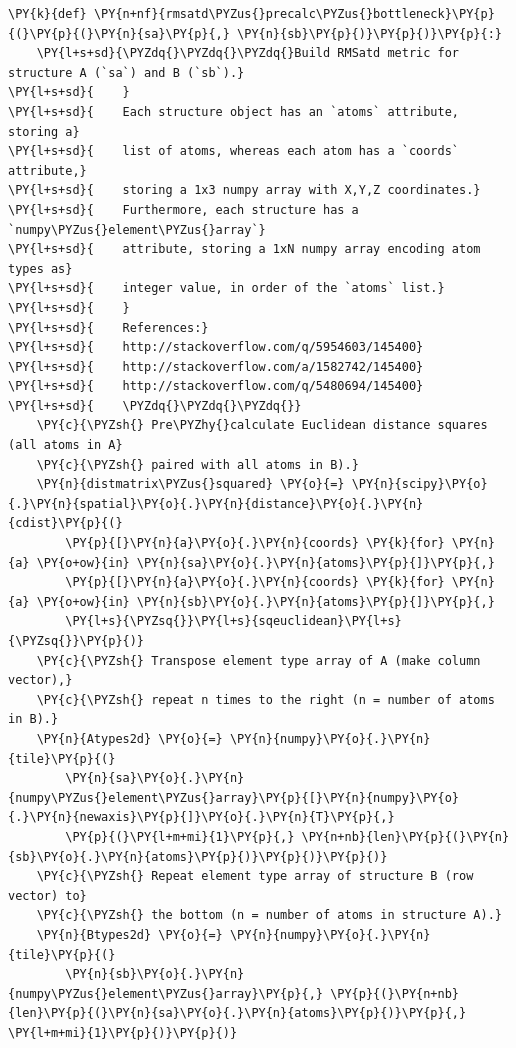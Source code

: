 \begin{listing}
\begin{Verbatim}[fontsize=\tiny,commandchars=\\\{\}]
\PY{k}{def} \PY{n+nf}{rmsatd\PYZus{}precalc\PYZus{}bottleneck}\PY{p}{(}\PY{p}{(}\PY{n}{sa}\PY{p}{,} \PY{n}{sb}\PY{p}{)}\PY{p}{)}\PY{p}{:}
    \PY{l+s+sd}{\PYZdq{}\PYZdq{}\PYZdq{}Build RMSatd metric for structure A (`sa`) and B (`sb`).}
\PY{l+s+sd}{    }
\PY{l+s+sd}{    Each structure object has an `atoms` attribute, storing a}
\PY{l+s+sd}{    list of atoms, whereas each atom has a `coords` attribute,}
\PY{l+s+sd}{    storing a 1x3 numpy array with X,Y,Z coordinates.}
\PY{l+s+sd}{    Furthermore, each structure has a `numpy\PYZus{}element\PYZus{}array`}
\PY{l+s+sd}{    attribute, storing a 1xN numpy array encoding atom types as}
\PY{l+s+sd}{    integer value, in order of the `atoms` list.}
\PY{l+s+sd}{    }
\PY{l+s+sd}{    References:}
\PY{l+s+sd}{    http://stackoverflow.com/q/5954603/145400}
\PY{l+s+sd}{    http://stackoverflow.com/a/1582742/145400}
\PY{l+s+sd}{    http://stackoverflow.com/q/5480694/145400}
\PY{l+s+sd}{    \PYZdq{}\PYZdq{}\PYZdq{}}
    \PY{c}{\PYZsh{} Pre\PYZhy{}calculate Euclidean distance squares (all atoms in A}
    \PY{c}{\PYZsh{} paired with all atoms in B).}
    \PY{n}{distmatrix\PYZus{}squared} \PY{o}{=} \PY{n}{scipy}\PY{o}{.}\PY{n}{spatial}\PY{o}{.}\PY{n}{distance}\PY{o}{.}\PY{n}{cdist}\PY{p}{(}
        \PY{p}{[}\PY{n}{a}\PY{o}{.}\PY{n}{coords} \PY{k}{for} \PY{n}{a} \PY{o+ow}{in} \PY{n}{sa}\PY{o}{.}\PY{n}{atoms}\PY{p}{]}\PY{p}{,}
        \PY{p}{[}\PY{n}{a}\PY{o}{.}\PY{n}{coords} \PY{k}{for} \PY{n}{a} \PY{o+ow}{in} \PY{n}{sb}\PY{o}{.}\PY{n}{atoms}\PY{p}{]}\PY{p}{,}
        \PY{l+s}{\PYZsq{}}\PY{l+s}{sqeuclidean}\PY{l+s}{\PYZsq{}}\PY{p}{)}
    \PY{c}{\PYZsh{} Transpose element type array of A (make column vector),}
    \PY{c}{\PYZsh{} repeat n times to the right (n = number of atoms in B).}
    \PY{n}{Atypes2d} \PY{o}{=} \PY{n}{numpy}\PY{o}{.}\PY{n}{tile}\PY{p}{(}
        \PY{n}{sa}\PY{o}{.}\PY{n}{numpy\PYZus{}element\PYZus{}array}\PY{p}{[}\PY{n}{numpy}\PY{o}{.}\PY{n}{newaxis}\PY{p}{]}\PY{o}{.}\PY{n}{T}\PY{p}{,}
        \PY{p}{(}\PY{l+m+mi}{1}\PY{p}{,} \PY{n+nb}{len}\PY{p}{(}\PY{n}{sb}\PY{o}{.}\PY{n}{atoms}\PY{p}{)}\PY{p}{)}\PY{p}{)}
    \PY{c}{\PYZsh{} Repeat element type array of structure B (row vector) to}
    \PY{c}{\PYZsh{} the bottom (n = number of atoms in structure A).}
    \PY{n}{Btypes2d} \PY{o}{=} \PY{n}{numpy}\PY{o}{.}\PY{n}{tile}\PY{p}{(}
        \PY{n}{sb}\PY{o}{.}\PY{n}{numpy\PYZus{}element\PYZus{}array}\PY{p}{,} \PY{p}{(}\PY{n+nb}{len}\PY{p}{(}\PY{n}{sa}\PY{o}{.}\PY{n}{atoms}\PY{p}{)}\PY{p}{,} \PY{l+m+mi}{1}\PY{p}{)}\PY{p}{)}

\end{Verbatim}
\end{listing}
